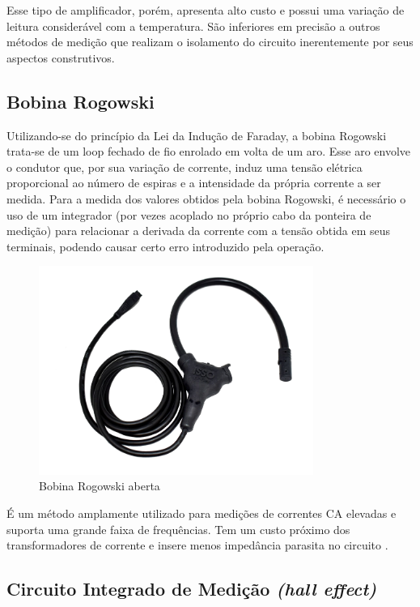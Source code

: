 Esse tipo de amplificador, porém, apresenta alto custo e possui uma variação de leitura considerável com a temperatura. São inferiores em precisão a outros métodos de medição que realizam o isolamento do circuito inerentemente por seus aspectos construtivos.

\subsection{Bobina Rogowski}\label{subsec:Rogowski}

Utilizando-se do princípio da Lei da Indução de Faraday, a bobina Rogowski trata-se de um loop fechado de fio enrolado em volta de um aro. Esse aro envolve o condutor que, por sua variação de corrente, induz uma tensão elétrica proporcional ao número de espiras e a intensidade da própria corrente a ser medida. Para a medida dos valores obtidos pela bobina Rogowski, é necessário o uso de um integrador (por vezes acoplado no próprio cabo da ponteira de medição) para relacionar a derivada da corrente com a tensão obtida em seus terminais, podendo causar certo erro introduzido pela operação.

\begin{figure}[htb!]
    \caption{Bobina Rogowski aberta}
    \label{fig:rogowski-bobina}
    \includegraphics[width=0.8\textwidth]{figuras/bobina-rogowski.png}
\end{figure}

É um método amplamente utilizado para medições de correntes CA elevadas e suporta uma grande faixa de frequências. Tem um custo próximo dos transformadores de corrente e insere menos impedância parasita no circuito \citep{curr_sens_tech}.

\subsection{Circuito Integrado de Medição \textit{(hall effect)}}\label{subsec:halleffect}

